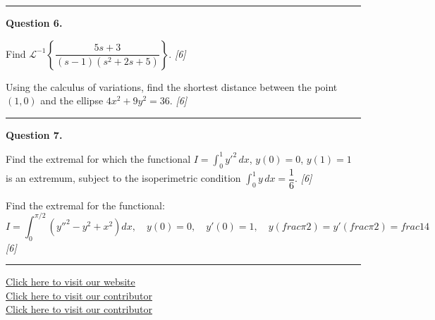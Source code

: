 \documentclass[11pt,a4paper]{article}
\newcommand{\pts}[1]{\hfill   \textit{[#1]}}
\begin{document}
\medskip\rule{\linewidth}{0.2pt}

\medskip


\noindent   \textbf{Question 6.}

\begin{parts}
  \item Find $\mathcal{L}^{-1}\!\left\{\dfrac{5s+3}{(s-1)(s^2+2s+5)}\right\}$. \pts{6}
  \item Using the calculus of variations, find the shortest distance between the point $(1, 0)$ and the ellipse $4x^2 + 9y^2 = 36$. \pts{6}
\end{parts}

\medskip\rule{\linewidth}{0.2pt}

\medskip


\noindent   \textbf{Question 7.}

\begin{parts}
  \item Find the extremal for which the functional $I = \int_0^1 y'^2\,dx$, $y(0) = 0$, $y(1) = 1$ is an extremum, subject to the isoperimetric condition $\int_0^1 y\,dx = \dfrac{1}{6}$. \pts{6}
  \item Find the extremal for the functional:
  \[
  I = \int_0^{\pi/2} \left(y''^2 - y^2 + x^2\right)dx, \quad y(0) = 0,\quad y'\!\left(0\right) = 1,\quad y\!\left( frac{\pi}{2}\right) = y'\!\left( frac{\pi}{2}\right) =  frac{1}{4}
  \] \pts{6}
\end{parts}

\vfill
\rule{\linewidth}{0.4pt}

\begin{center}\small
  \href{https://bhu-exam.vercel.app/}{Click here to visit our website}\\[4pt]
  \href{https://me-aryan.vercel.app/}{Click here to visit our contributor}\\[4pt]
  \href{https://quashan-me.vercel.app/}{Click here to visit our contributor}
\end{center}
\end{document}
